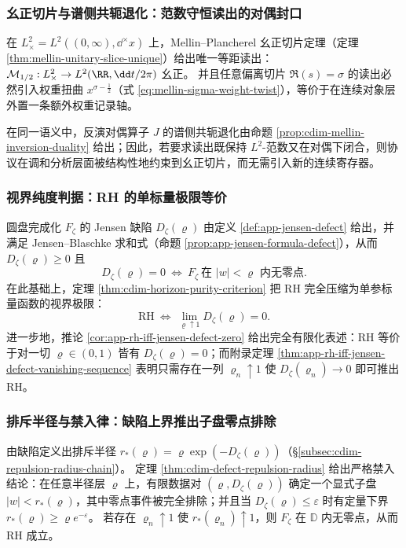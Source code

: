 \subsubsection{幺正切片与谱侧共轭退化：范数守恒读出的对偶封口}
在 \(L^2_{\times}=L^{2}((0,\infty),\dd^{\times}x)\) 上，Mellin--Plancherel 幺正切片定理（定理 \ref{thm:mellin-unitary-slice-unique}）给出唯一等距读出：\(\mathcal{M}_{1/2}:L^{2}_{\times}\to L^{2}(\RR,\dd t/2\pi)\) 幺正。
并且任意偏离切片 \(\Re(s)=\sigma\) 的读出必然引入权重扭曲 \(x^{\sigma-\frac12}\)（式 \eqref{eq:mellin-sigma-weight-twist}），等价于在连续对象层外置一条额外权重记录轴。
\par
在同一语义中，反演对偶算子 \(J\) 的谱侧共轭退化由命题 \ref{prop:cdim-mellin-inversion-duality} 给出；因此，若要求读出既保持 \(L^{2}\)-范数又在对偶下闭合，则协议在调和分析层面被结构性地约束到幺正切片，而无需引入新的连续寄存器。

\subsubsection{视界纯度判据：RH 的单标量极限等价}
圆盘完成化 \(F_{\zeta}\) 的 Jensen 缺陷 \(D_{\zeta}(\varrho)\) 由定义 \ref{def:app-jensen-defect} 给出，并满足 Jensen--Blaschke 求和式（命题 \ref{prop:app-jensen-formula-defect}），从而 \(D_{\zeta}(\varrho)\ge 0\) 且
\[
D_{\zeta}(\varrho)=0\ \Longleftrightarrow\ F_{\zeta}\ \text{在 }|w|<\varrho\text{ 内无零点}.
\]
在此基础上，定理 \ref{thm:cdim-horizon-purity-criterion} 把 RH 完全压缩为单参标量函数的视界极限：
\[
\mathrm{RH}\ \Longleftrightarrow\ \lim_{\varrho\uparrow 1}D_{\zeta}(\varrho)=0.
\]
进一步地，推论 \ref{cor:app-rh-iff-jensen-defect-zero} 给出完全有限化表述：RH 等价于对一切 \(\varrho\in(0,1)\) 皆有 \(D_{\zeta}(\varrho)=0\)；而附录定理 \ref{thm:app-rh-iff-jensen-defect-vanishing-sequence} 表明只需存在一列 \(\varrho_n\uparrow 1\) 使 \(D_{\zeta}(\varrho_n)\to 0\) 即可推出 RH。

\subsubsection{排斥半径与禁入律：缺陷上界推出子盘零点排除}
由缺陷定义出排斥半径 \(r_{\ast}(\varrho)=\varrho\exp(-D_{\zeta}(\varrho))\)（\S\ref{subsec:cdim-repulsion-radius-chain}）。
定理 \ref{thm:cdim-defect-repulsion-radius} 给出严格禁入结论：在任意半径层 \(\varrho\) 上，有限数据对 \((\varrho, D_{\zeta}(\varrho))\) 确定一个显式子盘 \(|w|<r_{\ast}(\varrho)\)，其中零点事件被完全排除；并且当 \(D_{\zeta}(\varrho)\le \varepsilon\) 时有定量下界 \(r_{\ast}(\varrho)\ge \varrho e^{-\varepsilon}\)。
若存在 \(\varrho_n\uparrow 1\) 使 \(r_{\ast}(\varrho_n)\uparrow 1\)，则 \(F_{\zeta}\) 在 \(\mathbb{D}\) 内无零点，从而 RH 成立。

